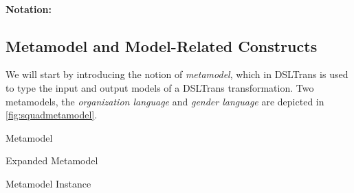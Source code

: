 

\paragraph{\textbf{Notation:}}

\subsection{Metamodel and Model-Related Constructs}
\label{sec:DSLTrans_formal}


We will start by introducing the notion of \emph{metamodel}, which in DSLTrans is used to type the input and output models of a DSLTrans transformation.  Two metamodels, the \emph{organization language} and \emph{gender language} are depicted in \cref{fig:squadmetamodel}.

\begin{definition}{Metamodel\\}
\label{def:metamodel}
\end{definition}


\begin{definition}{Expanded Metamodel\\}
\label{def:expanded_metamodel}
\end{definition}


\begin{definition}{Metamodel Instance\\}
\label{def:metamodelinstance}
\end{definition}

